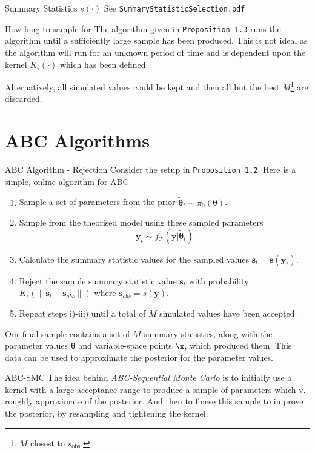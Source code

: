 \documentclass[11pt,a4paper]{article}
\begin{document}
  \begin{proposition}{Summary Statistics $s(\cdot)$}
    See \texttt{SummaryStatisticSelection.pdf}
  \end{proposition}

  \begin{proposition}{How long to sample for}
    The algorithm given in \texttt{Proposition 1.3} runs the algorithm until a sufficiently large sample has been produced. This is not ideal as the algorithm will run for an unknown period of time and is dependent upon the kernel $K_\epsilon(\cdot)$ which has been defined.
    \par Alternatively, all simulated values could be kept and then all but the best $M$\footnote{$M$ closest to $s_\text{obs}$.} are discarded.
  \end{proposition}

\section{ABC Algorithms}

  \begin{proposition}{ABC Algorithm - Rejection}
    Consider the setup in \texttt{Proposition 1.2}. Here is a simple, online algorithm for ABC
    \begin{enumerate}
      \item Sample a set of parameters from the prior $\tilde{\pmb\theta}_t\sim\pi_0(\pmb\theta)$.
      \item Sample from the theorised model using these sampled parameters
      \[ \mathbf{y}_t\sim f_\mathcal{T}(\mathbf{y}|\tilde{\pmb\theta}_t) \]
      \item Calculate the summary statistic values for the sampled values $\mathbf{s}_t=\mathbf{s}(\mathbf{y}_t)$.
      \item Reject the sample summary statistic value $\mathbf{s}_t$ with probability $K_\epsilon(\|\mathbf{s}_t-\mathbf{s}_{obs}\|)$ where ${\mathbf{s}_{obs}=s(\mathbf{y})}$.
      \item Repeat steps i)-iii) until a total of $M$ simulated values have been accepted.
    \end{enumerate}
    Our final sample contains a set of $M$ summary statistics, along with the parameter values $\pmb\theta$ and variable-space points $\x$, which produced them. This data can be used to approximate the posterior for the parameter values.
  \end{proposition}

  \begin{remark}{ABC-SMC}
    The idea behind \textit{ABC-Sequential Monte Carlo} is to initially use a kernel with a large acceptance range to produce a sample of parameters which v. roughly approximate of the posterior. And then to finese this sample to improve the posterior, by resampling and tightening the kernel.
  \end{remark}
\end{document}
